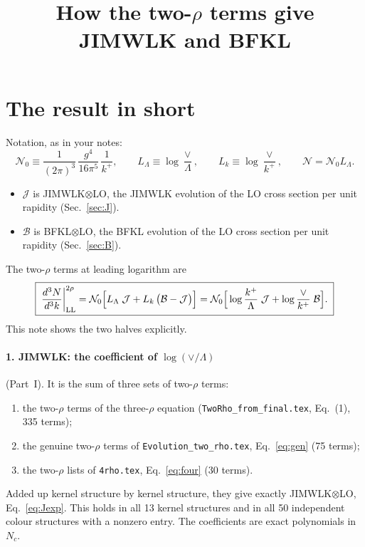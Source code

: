 \documentclass[10pt]{article}
\title{How the two-$\rho$ terms give JIMWLK and BFKL}
\date{}
\numberwithin{equation}{section}
\newcommand{\NN}{\mathcal N}
\newcommand{\NO}{\mathcal N_0}
\newcommand{\LL}{L_\Lambda}
\newcommand{\Lk}{L_k}
\newcommand{\J}{\mathcal J}
\newcommand{\B}{\mathcal B}
\begin{document}
\maketitle
\tableofcontents

\section{The result in short}\label{sec:short}
Notation, as in your notes:
\begin{equation}
\NO\equiv\frac{1}{(2\pi)^3}\,\frac{g^4}{16\pi^5}\,\frac1{k^+},\qquad \LL\equiv\log\frac\vee\Lambda,\qquad\Lk\equiv\log\frac\vee{k^+},\qquad \NN=\NO\LL .
\end{equation}
\begin{itemize}
\item $\J$ is JIMWLK$\otimes$LO, the JIMWLK evolution of the LO cross section per unit rapidity (Sec.~\ref{sec:J}).
\item $\B$ is BFKL$\otimes$LO, the BFKL evolution of the LO cross section per unit rapidity (Sec.~\ref{sec:B}).
\end{itemize}
The two-$\rho$ terms at leading logarithm are
\begin{equation}
\boxed{\;\frac{d^3N}{d^3k}\bigg|_{\rm LL}^{2\rho}=\NO\Big[\LL\;\J+\Lk\,\big(\B-\J\big)\Big]=\NO\Big[\log\frac{k^+}{\Lambda}\;\J+\log\frac{\vee}{k^+}\;\B\Big].\;}
\label{eq:result}
\end{equation}
This note shows the two halves explicitly.

\paragraph{1. JIMWLK: the coefficient of $\log(\vee/\Lambda)$} (Part~I). It is the sum of three sets of two-$\rho$ terms:
\begin{enumerate}
\item[(a)] the two-$\rho$ terms of the three-$\rho$ equation (\texttt{TwoRho\_from\_final.tex}, Eq.~(1), 335 terms);
\item[(b)] the genuine two-$\rho$ terms of \texttt{Evolution\_two\_rho.tex}, Eq.~\eqref{eq:gen} (75 terms);
\item[(c)] the two-$\rho$ lists of \texttt{4rho.tex}, Eq.~\eqref{eq:four} (30 terms).
\end{enumerate}
Added up kernel structure by kernel structure, they give exactly JIMWLK$\otimes$LO, Eq.~\eqref{eq:Jexp}. This holds in all 13 kernel structures and in all 50 independent colour structures with a nonzero entry. The coefficients are exact polynomials in $N_c$.
\end{document}
